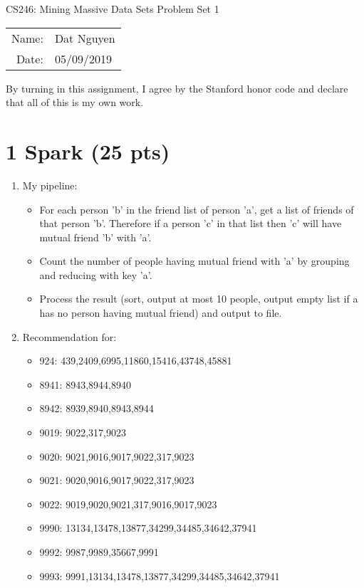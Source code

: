 \documentclass[12pt]{article}
\begin{document}
\begin{center}
{\Large CS246: Mining Massive Data Sets Problem Set 1}

\begin{tabular}{rl}     
Name: & Dat Nguyen \\
Date: & 05/09/2019
\end{tabular}
\end{center}
 
 By turning in this assignment, I agree by the Stanford honor code and declare that all of this is my own work.

\section*{1 Spark (25 pts)}
\begin{enumerate}
	\addtocounter{enumi}{1}
	\item My pipeline:
		\begin{itemize}
			\item For each person 'b' in the friend list of person 'a', get a list of friends of that person 'b'. Therefore if a person 'c' in that list then 'c' will have mutual friend 'b' with 'a'.
			\item Count the number of people having mutual friend with 'a' by grouping and reducing with key 'a'.
			\item Process the result (sort, output at most 10 people, output empty list if a has no person having mutual friend) and output to file.
		\end{itemize}
	\item Recommendation for:
		\begin{itemize}
			\item 924: 439,2409,6995,11860,15416,43748,45881
			\item 8941: 8943,8944,8940 
			\item 8942: 8939,8940,8943,8944 
			\item 9019: 9022,317,9023
			\item 9020: 9021,9016,9017,9022,317,9023
			\item 9021: 9020,9016,9017,9022,317,9023
			\item 9022: 9019,9020,9021,317,9016,9017,9023
			\item 9990: 13134,13478,13877,34299,34485,34642,37941
			\item 9992: 9987,9989,35667,9991
			\item 9993: 9991,13134,13478,13877,34299,34485,34642,37941
		\end{itemize}
\end{enumerate}
\end{document}

